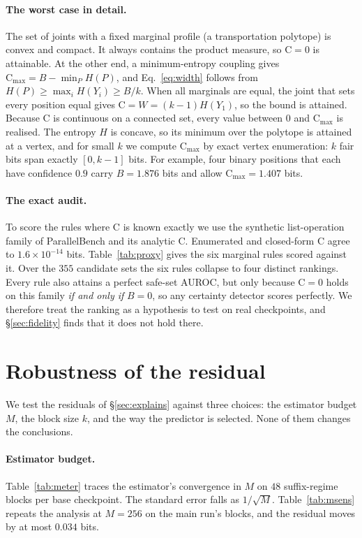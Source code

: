 \documentclass{article}
\newcommand{\C}{\mathrm{C}}
\begin{document}
\paragraph{The worst case in detail.}
\label{app:fibre}
The set of joints with a fixed marginal profile (a transportation polytope) is convex
and compact. It always contains the product measure, so $\C=0$ is attainable. At the
other end, a minimum-entropy coupling gives $\C_{\max}=B-\min_P H(P)$, and
Eq.~\eqref{eq:width} follows from $H(P)\ge\max_i H(Y_i)\ge B/k$. When all marginals are
equal, the joint that sets every position equal gives $\C=W=(k{-}1)H(Y_1)$, so the bound
is attained. Because $\C$ is continuous on a connected set, every value between $0$ and
$\C_{\max}$ is realised. The entropy $H$ is concave, so its minimum over the polytope is
attained at a vertex, and for small $k$ we compute $\C_{\max}$ by exact vertex
enumeration: $k$ fair bits span exactly $[0,k{-}1]$ bits. For example, four binary
positions that each have confidence $0.9$ carry $B=1.876$ bits and allow
$\C_{\max}=1.407$ bits.

\paragraph{The exact audit.}
\label{app:oracle}
To score the rules where $\C$ is known exactly we use the synthetic list-operation
family of ParallelBench \cite{parallelbench} and its analytic $\C$. Enumerated and
closed-form $\C$ agree to $1.6\times10^{-14}$ bits. Table~\ref{tab:proxy} gives the six
marginal rules scored against it. Over the $355$ candidate sets the six rules collapse
to four distinct rankings. Every rule also attains a perfect safe-set AUROC, but only
because $\C=0$ holds on this family \emph{if and only if} $B=0$, so any certainty
detector scores perfectly. We therefore treat the ranking as a hypothesis to test on
real checkpoints, and \S\ref{sec:fidelity} finds that it does not hold there.


\section{Robustness of the residual}
\label{app:robust}
We test the residuals of \S\ref{sec:explains} against three choices: the estimator
budget $M$, the block size $k$, and the way the predictor is selected. None of them
changes the conclusions.

\paragraph{Estimator budget.}
\label{app:budget}
Table~\ref{tab:meter} traces the estimator's convergence in $M$ on $48$ suffix-regime
blocks per base checkpoint. The standard error falls as $1/\sqrt{M}$.
Table~\ref{tab:msens} repeats the analysis at $M{=}256$ on the main run's blocks, and
the residual moves by at most $0.034$ bits.
\end{document}
